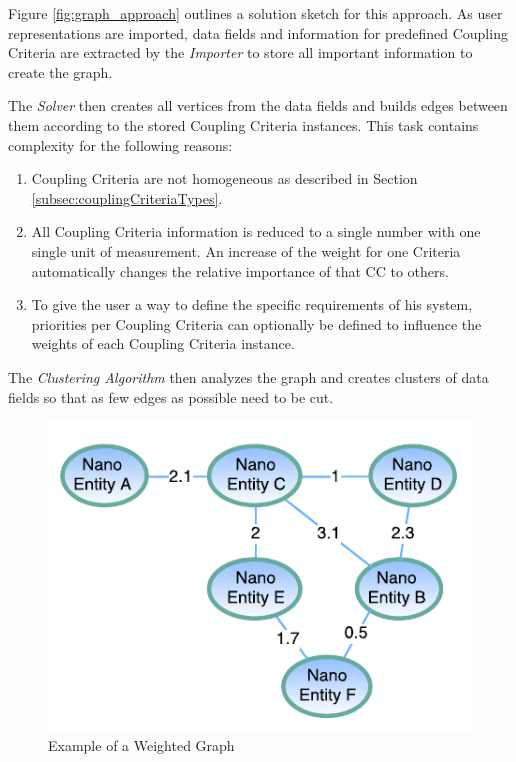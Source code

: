\begin{minipage}[t]{0.5\textwidth}
	Figure \ref{fig:graph_approach} outlines a solution sketch for this approach. As user representations are imported, data fields and  information for predefined Coupling Criteria are extracted by the \textit{Importer} to store all important information to create the graph.
	
	The \textit{Solver} then creates all vertices from the data fields and builds edges between them according to the stored Coupling Criteria instances. This task contains complexity for the following reasons:
	
	\begin{enumerate}
		\item Coupling Criteria are not homogeneous as described in Section \ref{subsec:couplingCriteriaTypes}. 
		
		\item All Coupling Criteria information is reduced to a single number with one single unit of measurement. An increase of the weight for one Criteria automatically changes the relative importance of that CC to others.
		
		\item To give the user a way to define the specific requirements of his system, priorities per Coupling Criteria can optionally be defined to influence the weights of each Coupling Criteria instance. 
	\end{enumerate}
	
	The \textit{Clustering Algorithm} then analyzes the graph and creates clusters of data fields so that as few edges as possible need to be cut.
	
	\begin{figure}[H]
		\includegraphics[scale=1.0]{diagrams/weighted_graph.pdf}
		\caption{Example of a Weighted Graph}
		\label{fig:weighted_graph}
	\end{figure}

\end{minipage}
